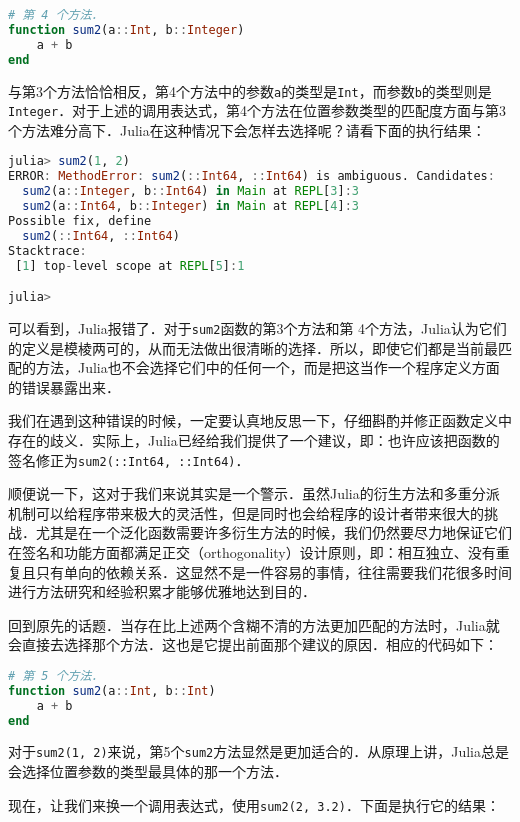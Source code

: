 \begin{lstlisting}[language=julia]
# 第 4 个方法．
function sum2(a::Int, b::Integer)
    a + b
end
\end{lstlisting}

与第3个方法恰恰相反，第4个方法中的参数\verb|a|的类型是\verb|Int|，而参数\verb|b|的类型则是\verb|Integer|．对于上述的调用表达式，第4个方法在位置参数类型的匹配度方面与第3个方法难分高下．Julia在这种情况下会怎样去选择呢？请看下面的执行结果：

\begin{lstlisting}[language=julia]
julia> sum2(1, 2)
ERROR: MethodError: sum2(::Int64, ::Int64) is ambiguous. Candidates:
  sum2(a::Integer, b::Int64) in Main at REPL[3]:3
  sum2(a::Int64, b::Integer) in Main at REPL[4]:3
Possible fix, define
  sum2(::Int64, ::Int64)
Stacktrace:
 [1] top-level scope at REPL[5]:1

julia> 
\end{lstlisting}

可以看到，Julia报错了．对于\verb|sum2|函数的第3个方法和第 4个方法，Julia认为它们的定义是模棱两可的，从而无法做出很清晰的选择．所以，即使它们都是当前最匹配的方法，Julia也不会选择它们中的任何一个，而是把这当作一个程序定义方面的错误暴露出来．

我们在遇到这种错误的时候，一定要认真地反思一下，仔细斟酌并修正函数定义中存在的歧义．实际上，Julia已经给我们提供了一个建议，即：也许应该把函数的签名修正为\verb|sum2(::Int64, ::Int64)|．

顺便说一下，这对于我们来说其实是一个警示．虽然Julia的衍生方法和多重分派机制可以给程序带来极大的灵活性，但是同时也会给程序的设计者带来很大的挑战．尤其是在一个泛化函数需要许多衍生方法的时候，我们仍然要尽力地保证它们在签名和功能方面都满足正交（orthogonality）设计原则，即：相互独立、没有重复且只有单向的依赖关系．这显然不是一件容易的事情，往往需要我们花很多时间进行方法研究和经验积累才能够优雅地达到目的．

回到原先的话题．当存在比上述两个含糊不清的方法更加匹配的方法时，Julia就会直接去选择那个方法．这也是它提出前面那个建议的原因．相应的代码如下：

\begin{lstlisting}[language=julia]
# 第 5 个方法．
function sum2(a::Int, b::Int)
    a + b
end
\end{lstlisting}

对于\verb|sum2(1, 2)|来说，第5个\verb|sum2|方法显然是更加适合的．从原理上讲，Julia总是会选择位置参数的类型最具体的那一个方法．

现在，让我们来换一个调用表达式，使用\verb|sum2(2, 3.2)|．下面是执行它的结果：

